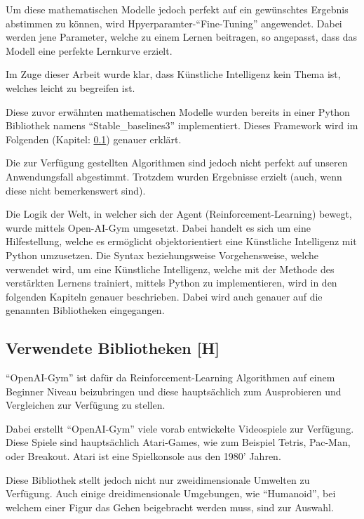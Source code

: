 Um diese mathematischen Modelle jedoch perfekt auf ein gewünschtes Ergebnis abstimmen zu können, wird Hpyerparamter-``Fine-Tuning'' angewendet. Dabei werden jene Parameter, welche zu einem Lernen beitragen, so angepasst, dass das Modell eine perfekte Lernkurve erzielt.

Im Zuge dieser Arbeit wurde klar, dass Künstliche Intelligenz kein Thema ist, welches leicht zu begreifen ist.

Diese zuvor erwähnten mathematischen Modelle wurden bereits in einer Python Bibliothek namens ``Stable\_baselines3'' implementiert. Dieses Framework wird im Folgenden (Kapitel: \ref{maai:usedLibraries}) genauer erklärt.

Die zur Verfügung gestellten Algorithmen sind jedoch nicht perfekt auf unseren Anwendungsfall abgestimmt. Trotzdem wurden Ergebnisse erzielt (auch, wenn diese nicht bemerkenswert sind).

Die Logik der Welt, in welcher sich der Agent (Reinforcement-Learning) bewegt, wurde mittels Open-AI-Gym umgesetzt. Dabei handelt es sich um eine Hilfestellung, welche es ermöglicht objektorientiert eine Künstliche Intelligenz mit Python umzusetzen. Die Syntax beziehungsweise Vorgehensweise, welche verwendet wird, um eine Künstliche Intelligenz, welche mit der Methode des verstärkten Lernens trainiert, mittels Python zu implementieren, wird in den folgenden Kapiteln genauer beschrieben. Dabei wird auch genauer auf die genannten Bibliotheken eingegangen.

\subsection{Verwendete Bibliotheken [H]}\label{maai:usedLibraries}


``OpenAI-Gym'' ist dafür da Reinforcement-Learning Algorithmen auf einem Beginner Niveau beizubringen und diese hauptsächlich zum Ausprobieren und Vergleichen zur Verfügung zu stellen.

Dabei erstellt ``OpenAI-Gym'' viele vorab entwickelte Videospiele zur Verfügung. Diese Spiele sind hauptsächlich Atari-Games, wie zum Beispiel Tetris, Pac-Man, oder Breakout. Atari ist eine Spielkonsole aus den 1980' Jahren.

Diese Bibliothek stellt jedoch nicht nur zweidimensionale Umwelten zu Verfügung. Auch einige dreidimensionale Umgebungen, wie ``Humanoid'', bei welchem einer Figur das Gehen beigebracht werden muss, sind zur Auswahl.


